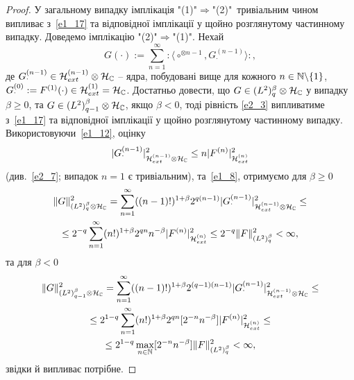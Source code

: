 \begin{proof}
У загальному випадку імплікація "(1)"$\Rightarrow$"(2)"\ тривіальним чином випливає
з~\eqref{e1_17} та відповідної імплікації у щойно розглянутому частинному випадку. Доведемо
імплікацію "(2)"$\Rightarrow$"(1)". Нехай
\begin{equation*}
G(\cdot):=\sum_{n=1}^\infty{:\!\langle}\circ^{\otimes n-1},G^{(n-1)}_\cdot{\rangle\!:},
\end{equation*}
де $G^{(n-1)}_\cdot\in\mathcal{H}_{ext}^{(n-1)}\otimes\mathcal{H}_{\mathbb{C}}$ -- ядра,
побудовані вище для кожного $n\in\mathbb{N}\backslash\{1\}$,
$G^{(0)}_\cdot:=F^{(1)}(\cdot)\in\mathcal{H}_{ext}^{(1)}=\mathcal{H}_{\mathbb{C}}$.
Достатньо довести, що $G\in (L^2)^\beta_q\otimes\mathcal{H}_{\mathbb{C}}$ у випадку $\beta\geq 0$,
та $G\in (L^2)^\beta_{q-1}\otimes\mathcal{H}_{\mathbb{C}}$, якщо $\beta<0$, тоді рівність
\eqref{e2_3} випливатиме з~\eqref{e1_17} та відповідної імплікації у щойно розглянутому
частинному випадку. Використовуючи~\eqref{e1_12}, оцінку
\begin{equation*}
|G^{(n-1)}_\cdot|_{\mathcal{H}_{ext}^{(n-1)}\otimes\mathcal{H}_{\mathbb{C}}}^2
\leq n|F^{(n)}|_{\mathcal{H}_{ext}^{(n)}}^2
\end{equation*}
(див.~\eqref{e2_7}; випадок $n=1$ є тривіальним), та~\eqref{e1_8}, отримуємо для $\beta\geq 0$
\begin{gather*}
\|G\|_{(L^2)^\beta_q\otimes\mathcal{H}_{\mathbb{C}}}^2
=\sum_{n=1}^\infty ((n-1)!)^{1+\beta}2^{q(n-1)}
|G^{(n-1)}_\cdot|_{\mathcal{H}_{ext}^{(n-1)}\otimes\mathcal{H}_{\mathbb{C}}}^2\leq\\
\leq 2^{-q}\sum_{n=1}^\infty (n!)^{1+\beta}2^{qn}n^{-\beta}
|F^{(n)}|_{\mathcal{H}_{ext}^{(n)}}^2
\leq 2^{-q}\|F\|_{(L^2)^\beta_q}^2<\infty,
\end{gather*}
та для $\beta<0$
\begin{gather*}
\|G\|_{(L^2)^\beta_{q-1}\otimes\mathcal{H}_{\mathbb{C}}}^2
=\sum_{n=1}^\infty ((n-1)!)^{1+\beta}2^{(q-1)(n-1)}
|G^{(n-1)}_\cdot|_{\mathcal{H}_{ext}^{(n-1)}\otimes\mathcal{H}_{\mathbb{C}}}^2\leq\\
\leq 2^{1-q}\sum_{n=1}^\infty (n!)^{1+\beta}2^{qn}[2^{-n}n^{-\beta}]
|F^{(n)}|_{\mathcal{H}_{ext}^{(n)}}^2\leq\\
\leq 2^{1-q}\max_{n\in\mathbb{N}}[2^{-n}n^{-\beta}]\|F\|_{(L^2)^\beta_q}^2<\infty,
\end{gather*}
звідки й випливає потрібне.
\end{proof}

